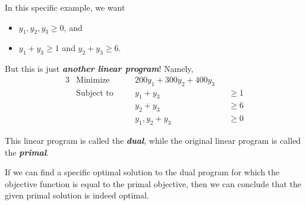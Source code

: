In this specific example, we want
\begin{itemize}
    \item $y_1,y_2,y_3 \geq 0$, and
    \item $y_1 + y_3 \geq 1$ and $y_2 + y_3 \geq 6$.
\end{itemize}
But this is just \textit{\textbf{another linear program}}! Namely,
\begin{alignat*}{3}
    &\text{Minimize} \quad && 200y_1 + 300y_2 + 400y_3 \\
    &\text{Subject to} \quad && y_1 + y_3 &&\geq 1 \\
                    & &&  y_2 + y_3 &&\geq 6 \\
                    & &&  y_1,y_2+y_3 &&\geq 0
\end{alignat*}

 
This linear program is called the \textit{\textbf{dual}}, while the original linear program is called the \textit{\textbf{primal}}.

If we can find a specific optimal solution to the dual program for which the objective function is equal to the primal objective, then we can conclude that the given primal solution is indeed optimal.